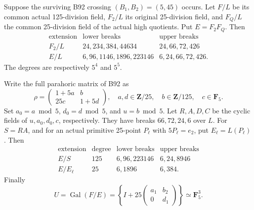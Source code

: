 \begin{proposition}
\label{prop:B-RD93-second-field}
Suppose the surviving B92 crossing \((B_1,B_2)=(5,45)\) occurs.
Let \(F/L\) be its common actual 125-division field, \(F_2/L\)
its original 25-division field, and \(F_Q/L\) the common
25-division field of the actual high quotients. Put
\(E=F_2F_Q\). Then
\[
 \begin{array}{c|c|c}
 \text{extension}&\text{lower breaks}&\text{upper breaks}\\\hline
 F_2/L&24,234,384,44634&24,66,72,426\\
 E/L&6,96,1146,1896,223146&6,24,66,72,426.
 \end{array}                                         \tag{B-RD93.5}
\]
The degrees are respectively \(5^4\) and \(5^5\).

Write the full parahoric matrix of B92 as
\[
 \rho=\begin{pmatrix}1+5a&b\\25c&1+5d\end{pmatrix},
 \quad a,d\in\mathbf Z/25,\quad b\in\mathbf Z/125,
 \quad c\in\mathbf F_5.
                                                               \tag{B-RD93.6}
\]
Set \(a_0=a\bmod5\), \(d_0=d\bmod5\), and \(u=b\bmod5\).
Let \(R,A,D,C\) be the cyclic fields of \(u,a_0,d_0,c\),
respectively. They have breaks \(66,72,24,6\) over \(L\).
For \(S=RA\), and for an actual primitive 25-point
\(P_\ell\) with \(5P_\ell=e_2\), put \(E_\ell=L(P_\ell)\).
Then
\[
 \begin{array}{c|c|c|c}
 \text{extension}&\text{degree}&\text{lower breaks}&\text{upper breaks}\\\hline
 E/S&125&6,96,223146&6,24,8946\\
 E/E_\ell&25&6,1896&6,384.
 \end{array}                                         \tag{B-RD93.7}
\]
Finally
\[
 U=\operatorname{Gal}(F/E)
 =\left\{I+25\begin{pmatrix}a_1&b_2\\0&d_1\end{pmatrix}\right\}
 \simeq\mathbf F_5^3.                                \tag{B-RD93.8}
\]
\end{proposition}
